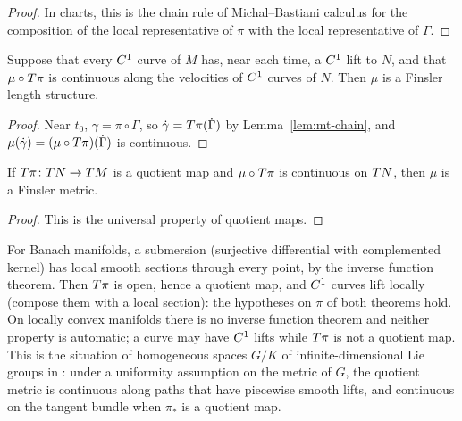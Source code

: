 \begin{proof}
  \leanok
  In charts, this is the chain rule of Michal--Bastiani calculus \cite{LCA} for the composition of
  the local representative of $\pi$ with the local representative of $\Gamma$.
\end{proof}

\begin{theorem}
  \label{thm:mt-lift-curves}
  \leanok
  Suppose that every $C^{1}$ curve of $M$ has, near each time, a $C^{1}$ lift to $N$, and that
  $\mu \circ T\pi$ is continuous along the velocities of $C^{1}$ curves of $N$. Then $\mu$ is a
  Finsler length structure.
\end{theorem}

\begin{proof}
  \leanok
  Near $t_0$, $\gamma = \pi \circ \Gamma$, so $\dot\gamma = T\pi(\dot\Gamma)$ by
  Lemma~\ref{lem:mt-chain}, and $\mu(\dot\gamma) = (\mu \circ T\pi)(\dot\Gamma)$ is continuous.
\end{proof}

\begin{theorem}
  \label{thm:mt-quotient-map}
  \leanok
  If $T\pi \colon T N \to T M$ is a quotient map and $\mu \circ T\pi$ is continuous on $T N$,
  then $\mu$ is a Finsler metric.
\end{theorem}

\begin{proof}
  \leanok
  This is the universal property of quotient maps.
\end{proof}

\begin{remark}
  For Banach manifolds, a submersion (surjective differential with complemented kernel) has local
  smooth sections through every point, by the inverse function theorem. Then $T\pi$ is open,
  hence a quotient map, and $C^{1}$ curves lift locally (compose them with a local section): the
  hypotheses on $\pi$ of both theorems hold. On locally convex manifolds there is no inverse
  function theorem and neither property is automatic; a curve may have $C^{1}$ lifts while
  $T\pi$ is not a quotient map. This is the situation of homogeneous spaces $G/K$ of
  infinite-dimensional Lie groups in \cite[Lemma~3.19]{Lar19}: under a uniformity assumption on
  the metric of $G$, the quotient metric is continuous along paths that have piecewise smooth
  lifts, and continuous on the tangent bundle when $\pi_*$ is a quotient map.
\end{remark}

